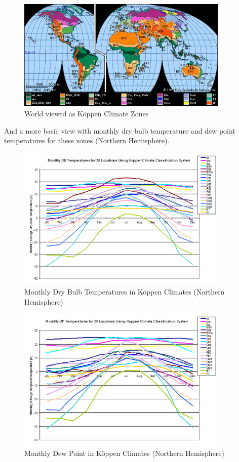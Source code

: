 \begin{figure}[hbtp] %
\centering
\includegraphics[width=0.9\textwidth, height=0.9\textheight, keepaspectratio=true]{media/image010.jpg}
\caption{World viewed as Köppen Climate Zones \protect \label{fig:world-viewed-as-kppen-climate-zones}}
\end{figure}

And a more basic view with monthly dry bulb temperature and dew point temperatures for these zones (Northern Hemisphere).

\begin{figure}[hbtp] %
\centering
\includegraphics[width=0.9\textwidth, height=0.9\textheight, keepaspectratio=true]{media/image011.png}
\caption{Monthly Dry Bulb Temperatures in Köppen Climates (Northern Hemisphere) \protect \label{fig:monthly-dry-bulb-temperatures-in-kppen}}
\end{figure}

\begin{figure}[hbtp] %
\centering
\includegraphics[width=0.9\textwidth, height=0.9\textheight, keepaspectratio=true]{media/image012.png}
\caption{Monthly Dew Point in Köppen Climates (Northern Hemisphere) \protect \label{fig:monthly-dew-point-in-kppen-climates-northern}}
\end{figure}
